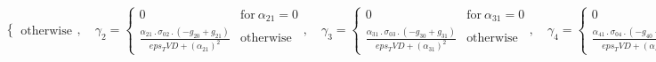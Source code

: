 \documentclass{article}
\begin{document}
\begin{dmath}
\begin{cases}
\text{otherwise} \end{cases}, \quad \gamma_{2} = \begin{cases} 0 & \text{for}\: \alpha_{21} = 0 \\\frac{\alpha_{21} \,.\, \sigma_{0 2} \,.\, \left(- g_{20} + g_{21}\right)}{eps_TVD + \left(\alpha_{21} \right)^{2}} & \text{otherwise} \end{cases}, 
\quad \gamma_{3} = \begin{cases} 0 & \text{for}\: \alpha_{31} = 0 \\\frac{\alpha_{31} \,.\, \sigma_{0 3} \,.\, \left(- g_{30} + g_{31}\right)}{eps_TVD + \left(\alpha_{31} \right)^{2}} & \text{otherwise} \end{cases}, \quad \gamma_{4} = \begin{cases} 0 
& \text{for}\: \alpha_{41} = 0 \\\frac{\alpha_{41} \,.\, \sigma_{0 4} \,.\, \left(- g_{40} + g_{41}\right)}{eps_TVD + \left(\alpha_{41} \right)^{2}} & \text{otherwise} \end{cases}, \quad \sigma_{1 0} = \begin{cases} \left|{\gamma_{0}}\right| & 
\text{for}\: \left|{\gamma_{0}}\right| \geq delta_TVD \\\frac{\left(delta_TVD \right)^{2} + \left(\gamma_{0} \right)^{2}}{2 \,.\, delta_TVD} & \text{otherwise} \end{cases}, \quad \sigma_{1 1} = \begin{cases} \left|{\gamma_{1}}\right| & \text{for}\: 
\left|{\gamma_{1}}\right| \geq delta_TVD \\\frac{\left(delta_TVD \right)^{2} + \left(\gamma_{1} \right)^{2}}{2 \,.\, delta_TVD} & \text{otherwise} \end{cases}, \quad \sigma_{1 2} = \begin{cases} \left|{\gamma_{2}}\right| & \text{for}\: 
\left|{\gamma_{2}}\right| \geq delta_TVD \\\frac{\left(delta_TVD \right)^{2} + \left(\gamma_{2} \right)^{2}}{2 \,.\, delta_TVD} & \text{otherwise} \end{cases}, \quad \sigma_{1 3} = \begin{cases} \left|{\gamma_{3}}\right| & \text{for}\: 
\left|{\gamma_{3}}\right| \geq delta_TVD \\\frac{\left(delta_TVD \right)^{2} + \left(\gamma_{3} \right)^{2}}{2 \,.\, delta_TVD} & \text{otherwise} \end{cases}, \quad \sigma_{1 4} = \begin{cases} \left|{\gamma_{4}}\right| & \text{for}\: 

\end{cases}
\end{dmath}
\end{document}
